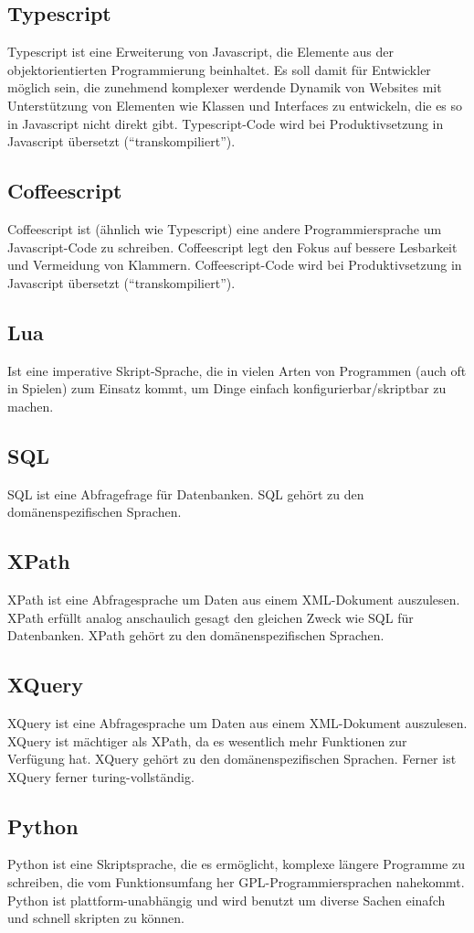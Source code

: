 \begin{multicols}{3}
\subsection{Typescript}
Typescript ist eine Erweiterung von Javascript, die Elemente aus der objektorientierten Programmierung beinhaltet. Es soll damit für Entwickler möglich sein, die zunehmend komplexer werdende Dynamik von Websites mit Unterstützung von Elementen wie Klassen und Interfaces zu entwickeln, die es so in Javascript nicht direkt gibt. Typescript-Code wird bei Produktivsetzung in Javascript übersetzt (\enquote{transkompiliert}).
\subsection{Coffeescript}
Coffeescript ist (ähnlich wie Typescript) eine andere Programmiersprache um Javascript-Code zu schreiben. Coffeescript legt den Fokus auf bessere Lesbarkeit und Vermeidung von Klammern. Coffeescript-Code wird bei Produktivsetzung in Javascript übersetzt (\enquote{transkompiliert}).
\subsection{Lua}
Ist eine imperative Skript-Sprache, die in vielen Arten von Programmen (auch oft in Spielen) zum Einsatz kommt, um Dinge einfach konfigurierbar/skriptbar zu machen.
\subsection{SQL}
SQL ist eine Abfragefrage für Datenbanken. SQL gehört zu den domänenspezifischen Sprachen.
\subsection{XPath}
XPath ist eine Abfragesprache um Daten aus einem XML-Dokument auszulesen. XPath erfüllt analog anschaulich gesagt den gleichen Zweck wie SQL für Datenbanken. XPath gehört zu den domänenspezifischen Sprachen.
\subsection{XQuery}
XQuery ist eine Abfragesprache um Daten aus einem XML-Dokument auszulesen. XQuery ist mächtiger als XPath, da es wesentlich mehr Funktionen zur Verfügung hat. XQuery gehört zu den domänenspezifischen Sprachen. Ferner ist XQuery ferner turing-vollständig.
\subsection{Python}
Python ist eine Skriptsprache, die es ermöglicht, komplexe längere Programme zu schreiben, die vom Funktionsumfang her GPL-Programmiersprachen nahekommt. Python ist plattform-unabhängig und wird benutzt um diverse Sachen einafch und schnell skripten zu können.

\end{multicols}
